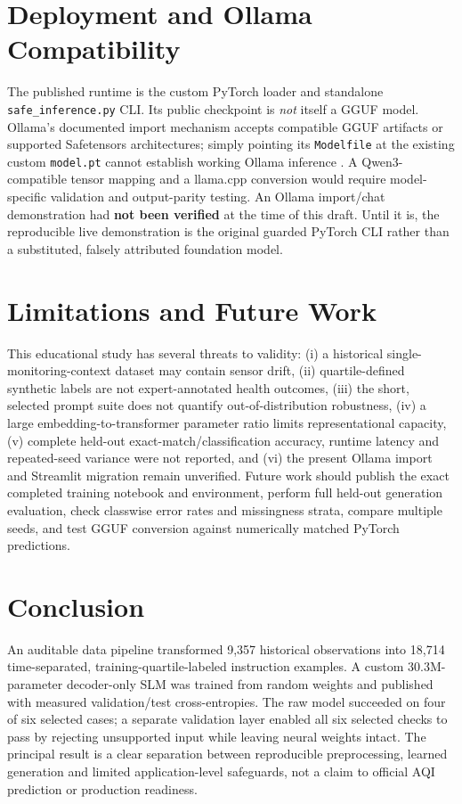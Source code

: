 \documentclass[conference,a4paper,10pt]{IEEEtran}
\begin{document}
\section{Deployment and Ollama Compatibility}
The published runtime is the custom PyTorch loader and standalone \texttt{safe\_inference.py} CLI. Its public checkpoint is \emph{not} itself a GGUF model. Ollama's documented import mechanism accepts compatible GGUF artifacts or supported Safetensors architectures; simply pointing its \texttt{Modelfile} at the existing custom \texttt{model.pt} cannot establish working Ollama inference \cite{ollama}. A Qwen3-compatible tensor mapping and a llama.cpp conversion would require model-specific validation and output-parity testing. An Ollama import/chat demonstration had \textbf{not been verified} at the time of this draft. Until it is, the reproducible live demonstration is the original guarded PyTorch CLI rather than a substituted, falsely attributed foundation model.

\section{Limitations and Future Work}
This educational study has several threats to validity: (i) a historical single-monitoring-context dataset may contain sensor drift, (ii) quartile-defined synthetic labels are not expert-annotated health outcomes, (iii) the short, selected prompt suite does not quantify out-of-distribution robustness, (iv) a large embedding-to-transformer parameter ratio limits representational capacity, (v) complete held-out exact-match/classification accuracy, runtime latency and repeated-seed variance were not reported, and (vi) the present Ollama import and Streamlit migration remain unverified. Future work should publish the exact completed training notebook and environment, perform full held-out generation evaluation, check classwise error rates and missingness strata, compare multiple seeds, and test GGUF conversion against numerically matched PyTorch predictions.

\section{Conclusion}
An auditable data pipeline transformed 9,357 historical observations into 18,714 time-separated, training-quartile-labeled instruction examples. A custom 30.3M-parameter decoder-only SLM was trained from random weights and published with measured validation/test cross-entropies. The raw model succeeded on four of six selected cases; a separate validation layer enabled all six selected checks to pass by rejecting unsupported input while leaving neural weights intact. The principal result is a clear separation between reproducible preprocessing, learned generation and limited application-level safeguards, not a claim to official AQI prediction or production readiness.
\end{document}
